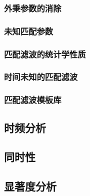 \subsubsection{外秉参数的消除}
\subsubsection{未知匹配参数}
\subsubsection{匹配滤波的统计学性质}
\subsubsection{时间未知的匹配滤波}
\subsubsection{匹配滤波模板库}
\subsection{时频分析}
\subsection{同时性}
\subsection{显著度分析}

